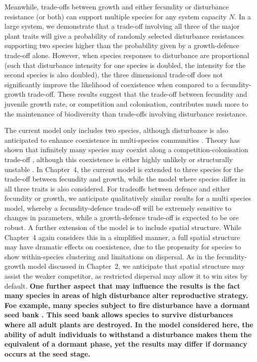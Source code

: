 Meanwhile, trade-offs between growth and either fecundity or disturbance resistance (or both) can support multiple species for any system capacity $N$. In a large system, we demonstrate that a trade-off involving all three of the major plant traits will give a probability of randomly selected disturbance resistances supporting two species higher than the probability given by a growth-defence trade-off alone. However, when species responses to disturbance are proportional (such that disturbance intensity for one species is doubled, the intensity for the second species is also doubled), the three dimensional trade-off does not significantly improve the likelihood of coexistence when compared to a fecundity-growth trade-off. These results suggest that the trade-off between fecundity and juvenile growth rate, or competition and colonisation, contributes much more to the maintenance of biodiversity than trade-offs involving disturbance resistance.  

The current model only includes two species, although disturbance is also anticipated to enhance coexistence in multi-species communities \citep[e.g.][]{loehle2000strategy,roxburgh2004intermediate}. Theory has shown that infinitely many species may coexist along a competition-colonisation trade-off \citep{tilman1994competition,adler2000space}, although this coexistence is either highly unlikely or structurally unstable \citep{nattrass2012quantifying, gyllenberg2005impossibility}. In Chapter~4, the current model is extended to three species for the trade-off between fecundity and growth, while the model where species differ in all three traits is also considered. For tradeoffs between defence and either fecundity or growth, we anticipate qualitatively similar results for a multi species model, whereby a fecundity-defence trade-off will be extremely sensitive to changes in parameters, while a growth-defence trade-off is expected to be ore robust. A further extension of the model is to include spatial structure. While Chapter~4 again considers this in a simplified manner, a full spatial structure may have dramatic effects on coexistence, due to the propensity for species to show within-species clustering \citep{condit2000spatial,murrell2001uniting} and limitations on dispersal. As in the fecundity-growth model discussed in Chapter~2, we anticipate that spatial structure may assist the weaker competitor, as restricted dispersal may allow it to win sites by default. \textbf{One further aspect that may influence the results is the fact many species in areas of high disturbance alter reproductive strategy. Foe example, many species subject to fire disturbance have a dormant seed bank \citep[e.g.][]{morgan1988seed,valbuena2001contribution}. This seed bank allows species to survive disturbances where all adult plants are destroyed. In the model considered here, the ability of adult individuals to withstand a disturbance makes them the equivalent of a dormant phase, yet the results may differ if dormancy occurs at the seed stage.}

